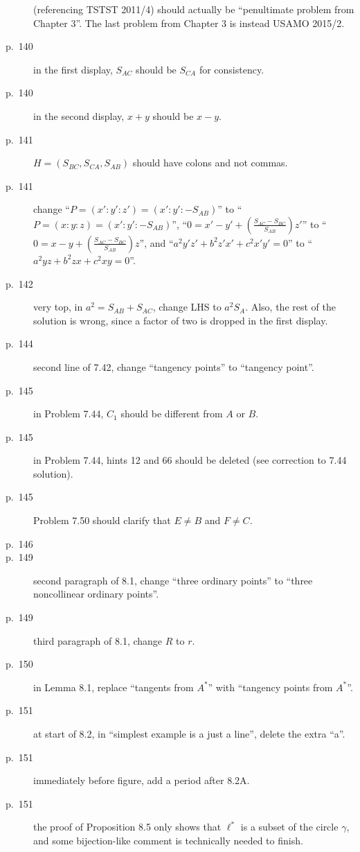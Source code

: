 \documentclass[11pt]{scrartcl}
\begin{document}
\begin{description}
  (referencing TSTST 2011/4) should actually be ``penultimate problem from Chapter 3''.
  The last problem from Chapter 3 is instead USAMO 2015/2.
\item[p.\  140] in the first display, $S_{AC}$ should be $S_{CA}$ for consistency.
\item[p.\  140] in the second display, $x+y$ should be $x-y$.
\item[p.\  141] $H = (S_{BC},S_{CA},S_{AB})$ should have
  colons and not commas.
\item[p.\  141] change ``$P = \left(x' : y' : z'\right) = \left(x' : y' : -S_{AB}\right)$''
  to ``$P = \left(x : y : z\right) = \left(x' : y' : -S_{AB}\right)$'',
  ``$0 = x' - y' + \left( \frac{S_{AC}-S_{BC}}{S_{AB}} \right) z'$''
  to ``$0 = x - y + \left( \frac{S_{AC}-S_{BC}}{S_{AB}} \right) z$'',
  and ``$a^2 y'z' + b^2 z'x' + c^2 x'y' = 0$''
  to ``$a^2 yz + b^2 zx + c^2 xy = 0$''.
\item[p.\  142] very top, in $a^2=S_{AB}+S_{AC}$, change LHS to $a^2S_A$.
  Also, the rest of the solution is wrong, since a factor of two is dropped in the first display.
\item[p.\  144] second line of 7.42, change ``tangency points'' to ``tangency point''.
\item[p.\  145] in Problem 7.44, $C_1$ should be different from $A$ or $B$.
\item[p.\  145] in Problem 7.44, hints 12 and 66 should be deleted (see correction to 7.44 solution).
\item[p.\  145] Problem 7.50 should clarify that $E \neq B$ and $F \neq C$.
\item[p.\  146] 
\item[p.\  149] second paragraph of 8.1, change ``three ordinary points''
  to ``three noncollinear ordinary points''.
\item[p.\  149] third paragraph of 8.1, change $R$ to $r$.
\item[p.\  150] in Lemma 8.1, replace ``tangents from $A^\ast$'' with ``tangency points from $A^\ast$''.
\item[p.\  151] at start of 8.2, in ``simplest example is a just a line'', delete the extra ``a''.
\item[p.\  151] immediately before figure, add a period after 8.2A.
\item[p.\  151] the proof of Proposition 8.5 only shows that $\ell^\ast$ is a subset of the circle
  $\gamma$, and some bijection-like comment is technically needed to finish.

\end{description}
\end{document}
